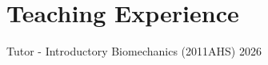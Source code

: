 \documentclass[../main.tex]{subfiles}
\begin{document}
\section{Teaching Experience}
  \vspace{2pt}
  \resumeSubHeadingListStart


  \layoutTeaching
    {Tutor - Introductory Biomechanics (2011AHS)}
    {2026}
  \resumeSubHeadingListEnd
\end{document}

